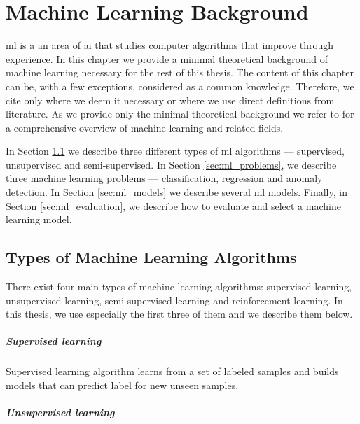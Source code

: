 \chapter{Machine Learning Background}
\label{chapter:ml}

\Acrfull{ml} is a an area of \acrshort{ai} that studies computer algorithms that improve through experience.
In this chapter we provide a minimal theoretical background of machine learning necessary for the rest of this thesis.
The content of this chapter can be, with a few exceptions, considered as a common knowledge.
Therefore, we cite only where we deem it necessary or where we use direct definitions from literature.
As we provide only the minimal theoretical background we refer to \cite{friedman2001elements, goodfellow2016deep, rokach2008data} for a comprehensive overview of machine learning and related fields.

In Section \ref{sec:ml_tasks} we describe three different types of \acrshort{ml} algorithms --- supervised, unsupervised and semi-supervised.
In Section \ref{sec:ml_problems}, we describe three machine learning problems --- classification, regression and anomaly detection.
In Section \ref{sec:ml_models} we describe several \acrshort{ml} models.
Finally, in Section \ref{sec:ml_evaluation}, we describe how to evaluate and select a machine learning model.

\section{Types of Machine Learning Algorithms}
\label{sec:ml_tasks}

There exist four main types of machine learning algorithms: supervised learning, unsupervised learning, semi-supervised learning and reinforcement-learning.
In this thesis, we use especially the first three of them and we describe them below.

\paragraph{Supervised learning}

Supervised learning algorithm learns from a set of labeled samples and builds models that can predict label for new unseen samples.

\paragraph{Unsupervised learning}


